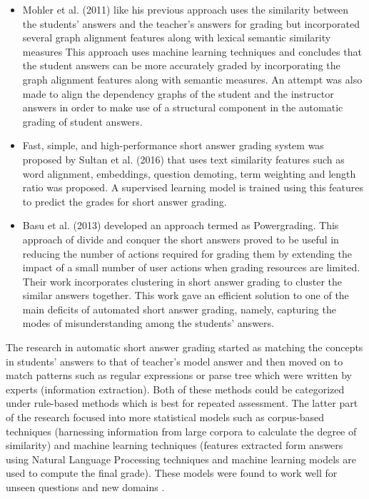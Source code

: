 \documentclass[rnd]{mas_proposal}
\begin{document}
\begin{itemize}
	\item Mohler et al. (2011) \cite{Mohler2011} like his previous approach uses the similarity between the students’ answers and the teacher’s answers for grading but incorporated several graph alignment features along with lexical semantic similarity measures This approach uses machine learning techniques and concludes that the student answers can be more accurately graded by incorporating the graph alignment features along with semantic measures. An attempt was also made to align the dependency graphs of the student and the instructor answers in order to make use of a structural component in the automatic grading of student answers.
	\item Fast, simple, and high-performance short answer grading system was proposed by Sultan et al. (2016) \cite{Sultan2016} that uses text similarity features such as word alignment, embeddings, question demoting, term weighting and length ratio was proposed. A supervised learning model is trained using this features to predict the grades for short answer grading.     
     
    \item Basu et al. (2013) \cite{Basu2013} developed an approach termed as Powergrading. This approach of divide and conquer the short answers proved to be useful in reducing the number of actions required for grading them by extending the impact of a small number of user actions when grading resources are limited. Their work incorporates clustering in short answer grading to cluster the similar answers together. This work gave an efficient solution to one of the main deficits of automated short answer grading, namely, capturing the modes of misunderstanding among the students’ answers.
    
\end{itemize}
    \newpage
    
The research in automatic short answer grading started as matching the concepts in students' answers to that of teacher's model answer and then moved on to match patterns such as regular expressions or parse tree which were written by experts (information extraction). Both of these methods could be categorized under rule-based methods which is best for repeated assessment. The latter part of the research focused into more statistical models such as corpus-based techniques (harnessing information from large corpora to calculate the degree of similarity) and machine learning techniques (features extracted form answers using Natural Language Processing techniques and machine learning models are used to compute the final grade). These models were found to work well for unseen questions and new domains \cite{Burrows2015}.
\end{document}
